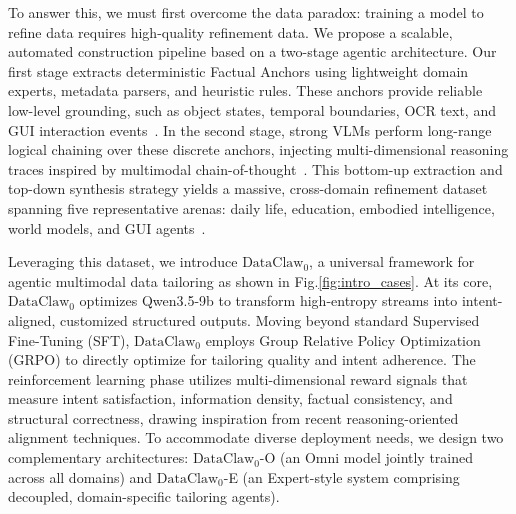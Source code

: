 \documentclass{llmxive}
\begin{document}




To answer this, we must first overcome the data paradox: training a model to refine data requires high-quality refinement data. We propose a scalable, automated construction pipeline based on a two-stage agentic architecture. Our first stage extracts deterministic Factual Anchors using lightweight domain experts, metadata parsers, and heuristic rules. These anchors provide reliable low-level grounding, such as object states, temporal boundaries, OCR text, and GUI interaction events~\cite{savva2019habitat,dai2017scannet,vlmad,spatialvlm,robospatial}. In the second stage, strong VLMs perform long-range logical chaining over these discrete anchors, injecting multi-dimensional reasoning traces inspired by multimodal chain-of-thought~\cite{zhang2023multimodalcot,chen2024measuring,qian2024visual}. This bottom-up extraction and top-down synthesis strategy yields a massive, cross-domain refinement dataset spanning five representative arenas: daily life, education, embodied intelligence, world models, and GUI agents~\cite{coin,omniworld,worldmem,epic-kitchens,wan2024grid,unireal,stepxedit,qwenimage,openvla,pi0,gr3,worldvla}.

Leveraging this dataset, we introduce \textbf{$\text{$\text{DataClaw}_0$}$}, a universal framework for agentic multimodal data tailoring as shown in Fig.\ref{fig:intro_cases}. At its core, $\text{DataClaw}_0$ optimizes Qwen3.5-9b to transform high-entropy streams into intent-aligned, customized structured outputs. Moving beyond standard Supervised Fine-Tuning (SFT), $\text{DataClaw}_0$ employs Group Relative Policy Optimization (GRPO)\cite{guo2025deepseekmathgrpo} to directly optimize for tailoring quality and intent adherence. The reinforcement learning phase utilizes multi-dimensional reward signals that measure intent satisfaction, information density, factual consistency, and structural correctness, drawing inspiration from recent reasoning-oriented alignment techniques\cite{rafailov2024dpo,sun2024llava-rlhf,wang2024reasoning,li2024enhancing}. To accommodate diverse deployment needs, we design two complementary architectures: $\text{DataClaw}_0$-O (an Omni model jointly trained across all domains) and $\text{DataClaw}_0$-E (an Expert-style system comprising decoupled, domain-specific tailoring agents).
\end{document}
